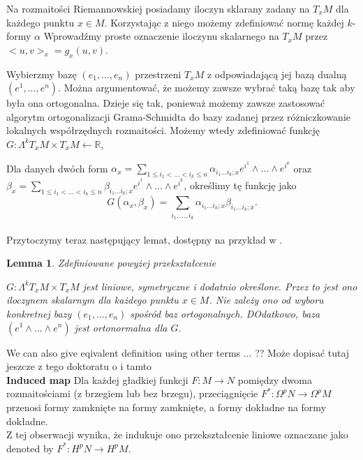 \documentclass[licencjacka]{pracamgr}
\theoremstyle{definition}
\theoremstyle{definition}
\theoremstyle{plain}
\newtheorem{lemma}{Lemma}[section]
\theoremstyle{plain}
\begin{document}
Na rozmaitości Riemannowskiej posiadamy iloczyn sklarany zadany na 
$T_x M$ dla każdego punktu $x \in M$.
Korzystając z niego możemy zdefiniować normę każdej $k$-formy $\alpha$
Wprowadźmy proste oznaczenie iloczynu skalarnego na
$T_x M$
przez
$<u, v>_x = g_x(u, v)$.

Wybierzmy bazę $(e_1, ..., e_n)$ przestrzeni $T_x M$ z odpowiadającą jej bazą dualną
$(e^1, ..., e^n)$.
Można argumentować, że możemy zawsze wybrać taką bazę tak aby była ona ortogonalna.
Dzieje się tak, ponieważ możemy zawsze zastosować algorytm ortogonalizacji 
Grama-Schmidta do bazy zadanej przez różniczkowanie lokalnych współrzędnych rozmaitości.
Możemy wtedy zdefiniować funkcję $G: \Lambda^k T_x M \times T_x M \leftarrow \mathbb{R}$, 

Dla danych dwóch form
$ \alpha_x = \sum_{1 \leq i_1 < ... < i_k \leq n} \alpha_{i_1 ... i_k; x} e^{i^1}
\wedge ...  \wedge e^{i^k}$ oraz
$ \beta_x = \sum_{1 \leq i_1 < ... < i_k \leq n} \beta_{i_1 ... i_k; x} e^{i^1}
\wedge ...  \wedge e^{i^k}$,  określimy tę funkcję jako
\[
    G(\alpha_x, \beta_x) = \sum_{i_1, ..., i_k} \alpha_{i_1 ... i_k; x}
                                                    \beta_{i_1 ... i_k; x}.
\] \\

Przytoczymy teraz następujący lemat, dostępny na przykład w \cite{lausanne}.


\begin{lemma}
    Zdefiniowane powyżej przekształcenie 

$G: \Lambda^k T_x M \times T_x M $ 
jest liniowe, symetryczne i dodatnio określone. Przez to jest ono iloczynem
skalarnym dla każdego punktu $x \in M$.  Nie zależy ono od wyboru konkretnej bazy
$(e_1, ..., e_n)$ spośród baz ortogonalnych.  DOdatkowo, baza
$(e^1 \wedge ... \wedge e^n)$ jest ortonormalna dla $G$.
\end{lemma}

We can also give eqivalent definition using other terms ... ?? Może dopisać tutaj jeszcze z tego doktoratu
o i tamto \\


\textbf{Induced map}
Dla każdej gładkiej funkcji $F: M \rightarrow N$ pomiędzy dwoma rozmaitościami
(z brzegiem lub bez brzegu), przeciągnięcie $F^\ast: \Omega^p N \rightarrow
\Omega^p M$ przenosi formy zamknięte na formy zamknięte, a formy dokładne na
formy dokładne. \\

Z tej obserwacji wynika, że indukuje ono przekształcenie liniowe
oznaczane jako denoted by $F^\ast: H^p N \rightarrow H^p M$. \\
\end{document}
